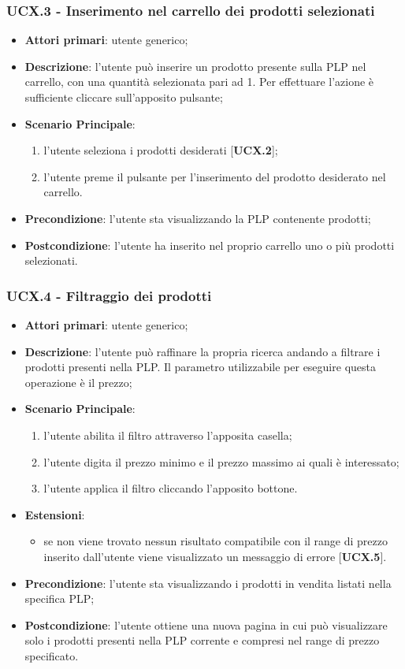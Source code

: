 \subsubsection{UCX.3 - Inserimento nel carrello dei prodotti selezionati}
\begin{itemize}
\item \textbf{Attori primari}: utente generico;
\item \textbf{Descrizione}: l'utente può inserire un prodotto presente sulla PLP nel carrello, con una quantità selezionata pari ad 1. Per effettuare l'azione è sufficiente cliccare sull'apposito pulsante;
\item \textbf{Scenario Principale}:
\begin{enumerate}
\item l'utente seleziona i prodotti desiderati [\textbf{UCX.2}];
\item l'utente preme il pulsante per l'inserimento del prodotto desiderato nel carrello.
\end{enumerate}
\item \textbf{Precondizione}: l'utente sta visualizzando la PLP contenente prodotti;
\item \textbf{Postcondizione}: l'utente ha inserito nel proprio carrello uno o più prodotti selezionati.
\end{itemize}
\subsubsection{UCX.4 - Filtraggio dei prodotti}
\begin{itemize}
\item \textbf{Attori primari}: utente generico;
\item \textbf{Descrizione}: l'utente può raffinare la propria ricerca andando a filtrare i prodotti presenti nella PLP. Il parametro utilizzabile per eseguire questa operazione è il prezzo;
\item \textbf{Scenario Principale}:
\begin{enumerate}
\item l'utente abilita il filtro attraverso l'apposita casella;
\item l'utente digita il prezzo minimo e il prezzo massimo ai quali è interessato;
\item l'utente applica il filtro cliccando l'apposito bottone.
\end{enumerate}
\item \textbf{Estensioni}:
\begin{itemize}
\item se non viene trovato nessun risultato compatibile con il range di prezzo inserito dall'utente viene visualizzato un messaggio di errore [\textbf{UCX.5}].
\end{itemize}
\item \textbf{Precondizione}: l'utente sta visualizzando i prodotti in vendita listati nella specifica PLP;
\item \textbf{Postcondizione}: l'utente ottiene una nuova pagina in cui può visualizzare solo i prodotti presenti nella PLP corrente e compresi nel range di prezzo specificato.
\end{itemize}
